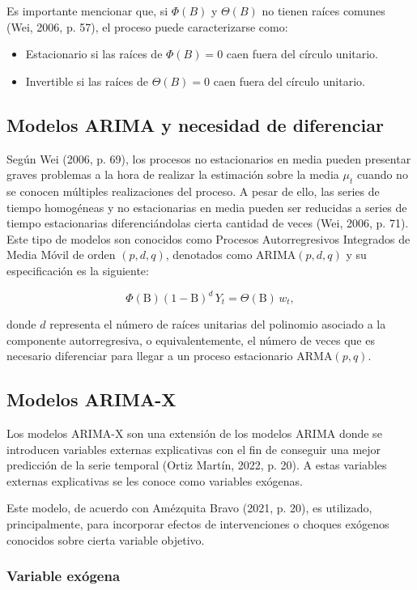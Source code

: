 \documentclass[11pt,letterpaper]{article}
\newcommand{\B}{\mathrm{B}}   %
\begin{document}
Es importante mencionar que, si $\Phi(B)$ y $\Theta(B)$ no tienen raíces comunes (Wei, 2006, p. 57), el proceso puede caracterizarse como:

\begin{itemize}
    \item Estacionario si las raíces de $\Phi(B) = 0$ caen fuera del círculo unitario.
    \item Invertible si las raíces de $\Theta(B) = 0$ caen fuera del círculo unitario.
\end{itemize}


\subsection{Modelos ARIMA y necesidad de diferenciar} 
Según Wei (2006, p. 69), los procesos no estacionarios en media pueden presentar graves problemas a la hora de realizar la estimación sobre la media $\mu_t$ cuando no se conocen múltiples realizaciones del proceso. A pesar de ello, las series de tiempo homogéneas y no estacionarias en media pueden ser reducidas a series de tiempo estacionarias diferenciándolas cierta cantidad de veces (Wei, 2006, p. 71). Este tipo de modelos son conocidos como Procesos Autorregresivos Integrados de Media Móvil de orden $(p, d, q)$, denotados como $\text{ARIMA}(p, d, q)$ y su especificación es la siguiente: 

\[
\Phi(\B)(1-\B)^d\,Y_t=\Theta(\B)\,w_t ,
\]

donde $d$ representa el número de raíces unitarias del polinomio asociado a la componente autorregresiva, o equivalentemente, el número de veces que es necesario diferenciar para llegar a un proceso estacionario $\text{ARMA}(p,q)$.

\subsection{Modelos ARIMA-X}
Los modelos ARIMA-X son una extensión de los modelos ARIMA donde se introducen variables externas explicativas con el fin de conseguir una mejor predicción de la serie temporal (Ortiz Martín, 2022, p. 20). A estas variables externas explicativas se les conoce como variables exógenas.

Este modelo, de acuerdo con Amézquita Bravo (2021, p. 20), es utilizado, principalmente, para incorporar efectos de intervenciones o choques exógenos conocidos sobre cierta variable objetivo.

\subsubsection{Variable exógena}
\end{document}
